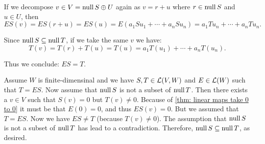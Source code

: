 \begin{xrcs}
\begin{prf}
   If we decompose $v \in V = \operatorname{null} S \oplus U$ again as $v = r + u$ where  $r \in \operatorname{null} S$ and $u \in U$, then
   \begin{equation}
     ES ( v ) = ES ( r + u) = ES( u) = E (a_1 S u_1 + \cdots + a_n S u_n) = a_1 T u_n + \cdots + a_n T u_n.
   \end{equation}

   Since $\operatorname{null} S \subseteq \operatorname{null} T$, if we take the same $v$ we have:
   \begin{equation}
     T(v) = T(r) + T(u) = T(u) = a_1 T(u_1) + \cdots + a_n T(u_n).
   \end{equation}

   Thus we conclude: $ES=T$.

   \Leftarrowdirection Assume $W$ is finite-dimensinal and we have $S,T \in \mathcal{L}(V,W)$ and $E \in \mathcal{L} (W)$ such that $T=ES$. Now assume that $\operatorname{null} S$ is not a subset of $\operatorname{null} T$. Then there exists a $v \in V$ such that $S(v) = 0$ but $T(v) \neq 0$. Because of \ref{thm: linear maps take 0 to 0} it must be that $E(0) = 0$, and thus $ES(v) = 0$. But we assumed that $T=ES$. Now we have $ES \neq T$ (because $T(v)\neq 0$). The assumption that $\operatorname{null} S$ is not a subset of $\operatorname{null} T$ has lead to a contradiction. Therefore, $\operatorname{null} S \subseteq \operatorname{null} T$, as desired.
  \end{prf}
\end{xrcs}